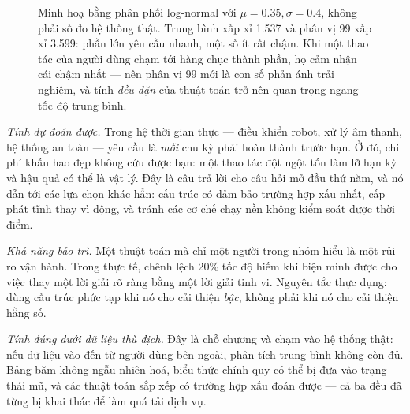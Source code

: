 \documentclass[../../algorithm.tex]{subfiles}
\begin{document}
\begin{figure}[H]\centering
{}
\caption{Minh hoạ bằng phân phối log-normal với \(\mu=0.35,\sigma=0.4\), không phải số đo hệ thống thật. Trung bình xấp xỉ 1.537 và phân vị 99 xấp xỉ 3.599: phần lớn yêu cầu nhanh, một số ít rất chậm. Khi một thao tác của người dùng chạm tới hàng chục thành phần, họ cảm nhận cái chậm nhất --- nên phân vị 99 mới là con số phản ánh trải nghiệm, và tính \emph{đều đặn} của thuật toán trở nên quan trọng ngang tốc độ trung bình.}
\label{fig:tail-latency}
\end{figure}

\emph{Tính dự đoán được.} Trong hệ thời gian thực --- điều khiển robot, xử lý âm thanh, hệ thống an toàn --- yêu cầu là \emph{mỗi} chu kỳ phải hoàn thành trước hạn. Ở đó, chi phí khấu hao đẹp không cứu được bạn: một thao tác đột ngột tốn  làm lỡ hạn kỳ và hậu quả có thể là vật lý. Đây là câu trả lời cho câu hỏi mở đầu thứ năm, và nó dẫn tới các lựa chọn khác hẳn: cấu trúc có đảm bảo trường hợp xấu nhất, cấp phát tĩnh thay vì động, và tránh các cơ chế chạy nền không kiểm soát được thời điểm.

\emph{Khả năng bảo trì.} Một thuật toán mà chỉ một người trong nhóm hiểu là một rủi ro vận hành. Trong thực tế, chênh lệch 20\% tốc độ hiếm khi biện minh được cho việc thay một lời giải rõ ràng bằng một lời giải tinh vi. Nguyên tắc thực dụng: dùng cấu trúc phức tạp khi nó cho cải thiện \emph{bậc}, không phải khi nó cho cải thiện hằng số.

\emph{Tính đúng dưới dữ liệu thù địch.} Đây là chỗ chương  và  chạm vào hệ thống thật: nếu dữ liệu vào đến từ người dùng bên ngoài, phân tích trung bình không còn đủ. Bảng băm không ngẫu nhiên hoá, biểu thức chính quy có thể bị đưa vào trạng thái mũ, và các thuật toán sắp xếp có trường hợp xấu đoán được --- cả ba đều đã từng bị khai thác để làm quá tải dịch vụ.
\end{document}
